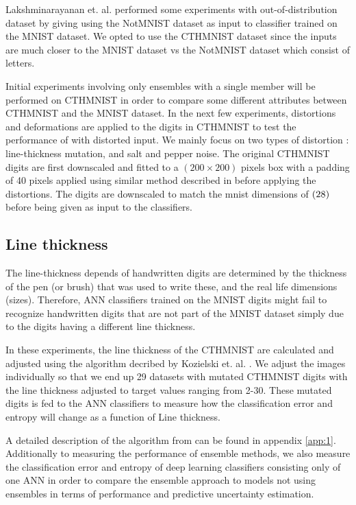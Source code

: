 Lakshminarayanan et. al. \cite{lakshminarayanan2017simple} performed some experiments with out-of-distribution dataset by giving using the NotMNIST dataset\cite{notmnist} as input to classifier trained on the MNIST dataset. We opted to use the CTHMNIST dataset since the inputs are much closer to the MNIST dataset vs the NotMNIST dataset which consist of letters. 

Initial experiments involving only ensembles with a single member will be performed on CTHMNIST in order to compare some different attributes between CTHMNIST and the MNIST dataset. In the next few experiments, distortions and deformations are applied to the digits in CTHMNIST to test the performance of \cite{lakshminarayanan2017simple} with distorted input. We mainly focus on two types of distortion : line-thickness mutation, and salt and pepper noise. The original CTHMNIST digits are first downscaled and fitted to a $(200\times200)$ pixels box with a padding of 40 pixels applied using similar method described in \cite{lecunmnist} before applying the distortions. The digits are downscaled to match the mnist dimensions of $(28\time28)$ before being given as input to the classifiers. 

\subsection{Line thickness}

The line-thickness depends of handwritten digits are determined by the thickness of the pen (or brush) that was used to write these, and the real life dimensions (sizes). Therefore, ANN classifiers trained on the MNIST digits might fail to recognize handwritten digits that are not part of the MNIST dataset simply due to the digits having a different line thickness.

In these experiments, the line thickness of the CTHMNIST are calculated and adjusted using the algorithm decribed by Kozielski et. al. \cite{kozielski2012moment}. We adjust the images individually so that we end up 29 datasets with mutated CTHMNIST digits with the line thickness adjusted to target values ranging from 2-30. These mutated digits is fed to the ANN classifiers to measure how the classification error and entropy will change as a function of Line thickness.

A detailed description of the algorithm from \cite{kozielski2012moment} can be found in appendix \ref{app:1}. Additionally to measuring the performance of ensemble methods, we also measure the classification error and entropy of deep learning classifiers consisting only of one ANN in order to compare the ensemble approach to models not using ensembles in terms of performance and predictive uncertainty estimation.

